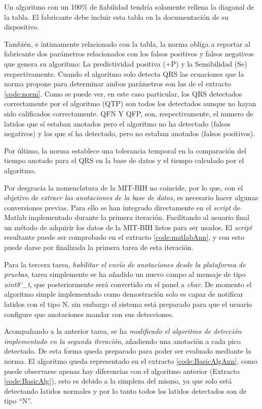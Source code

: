     Un algoritmo con un 100\% de fiabilidad tendría solamente rellena la diagonal de la tabla. El fabricante debe incluir esta tabla en la documentación de su dispositivo.
    
    También, e íntimamente relacionado con la tabla, la norma obliga  a reportar al fabricante dos parámetros relacionados con los falsos positivos y falsos negativos que genera su algoritmo: La predictividad positiva (+P) y la Sensibilidad (Se) respectivamente. Cuando el algoritmo solo detecta QRS las ecuaciones que la norma propone para determinar ambos parámetros son las de el extracto \ref{code:norm}. Como se puede ver, en este caso particular, los QRS detectados correctamente por el algoritmo (QTP) son todos los detectados aunque no hayan sido calificados correctamente. QFN Y QFP, son, respectivamente, el numero de latidos que sí estaban anotados pero el algoritmo no ha detectado (falsos negativos) y los que sí ha detectado, pero no estaban anotados (falsos positivos).
     
    Por último, la norma establece una tolerancia temporal en la comparación del tiempo anotado para el QRS en la base de datos y el tiempo calculado por el algoritmo. 
        
    Por desgracia la nomenclatura de la MIT-BIH no coincide, por lo que, con el objetivo de \textit{extraer las anotaciones de la base de datos}, es necesario hacer algunas conversiones previas. Para ello se han integrado directamente en el \textit{script} de Matlab implementado durante la primera iteración. Facilitando al usuario final un método de adquirir los datos de la MIT-BIH listos para ser usados. El \textit{script} resultante puede ser comprobado en el extracto \ref{code:matlabAnn}, y con esto puede darse por finalizada la primera tarea de esta iteración.
        
        
    Para la tercera tarea, \textit{habilitar el envío de anotaciones desde la plataforma de pruebas}, tarea simplemente se ha añadido un nuevo campo al mensaje de tipo \textit{uint8\char`_t}, que posteriormente será convertido en el panel a \textit{char}. De momento el algoritmo simple implementado como demostración solo es capaz de notificar latidos con el tipo N, sin embargo el sistema está preparado para que el usuario configure que anotaciones mandar con sus detecciones.
    
    Acompañando a la anterior tarea, se ha \textit{modificado el algoritmo de detección implementado en la segunda iteración}, añadiendo una anotación a cada pico detectado. De esta forma queda preparado para poder ser evaluado mediante la norma. El algoritmo queda representado en el extracto \ref{code:BasicAlgAnn}, como puede observarse apenas hay diferencias con el algoritmo anterior (Extracto \ref{code:BasicAlg}), esto es debido a la simpleza del mismo, ya que solo está detectando latidos normales y por lo tanto todos los latidos detectados son de tipo ``N''.
    
